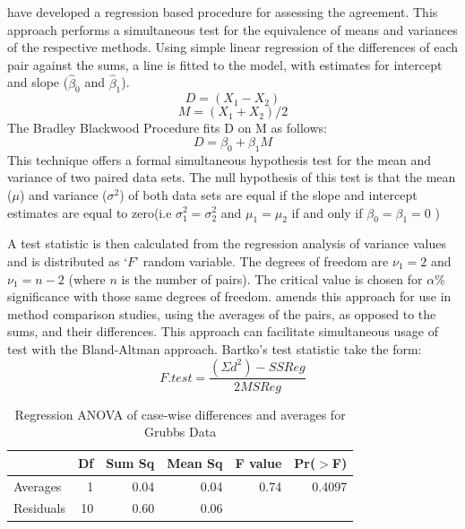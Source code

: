 \documentclass[12pt, a4paper]{report}
\theoremstyle{plain}
\theoremstyle{definition}
\theoremstyle{remark}
\begin{document}
	\citet{BB89} have developed a regression based procedure for
	assessing the agreement. This approach performs a simultaneous test for the equivalence of
	means and variances of the respective methods. Using simple linear
	regression of the differences of each pair against the sums, a
	line is fitted to the model, with estimates for intercept and
	slope ($\hat{\beta}_{0}$ and $\hat{\beta}_{1}$).
	\begin{equation}
		D = (X_{1}-X_{2})
	\end{equation}
	\begin{equation}
		M = (X_{1} + X_{2}) /2
	\end{equation}
	The Bradley Blackwood Procedure fits D on M as follows:\\
	\begin{equation}
		D = \beta_{0} + \beta_{1}M
	\end{equation}
	This technique offers a formal simultaneous hypothesis test for the
	mean and variance of two paired data sets.  The null
	hypothesis of this test is that the mean ($\mu$) and variance
	($\sigma^{2}$) of both data sets are equal if the slope and
	intercept estimates are equal to zero(i.e $\sigma^{2}_{1} =
	\sigma^{2}_{2}$ and $\mu_{1}=\mu_{2}$ if and only if $\beta_{0}=
	\beta_{1}=0$ )
	
	A test statistic is then calculated from the regression analysis
	of variance values \citep{BB89} and is distributed as `$F$' random
	variable. The degrees of freedom are $\nu_{1}=2$ and $\nu_{1}=n-2$
	(where $n$ is the number of pairs). The critical value is chosen
	for $\alpha\%$ significance with those same degrees of freedom.
	\citet{Bartko} amends this approach for use in method
	comparison studies, using the averages of the pairs, as opposed to
	the sums, and their differences. This approach can facilitate
	simultaneous usage of test with the Bland-Altman approach.
	Bartko's test statistic take the form:
	\[ F.test = \frac{(\Sigma d^{2})-SSReg}{2MSReg}
	\]
	\begin{table}[h!]
		\begin{center}
			\begin{tabular}{lrrrrr}
				\hline
				& Df & Sum Sq & Mean Sq & F value & Pr($>$F) \\
				\hline
				Averages & 1 & 0.04 & 0.04 & 0.74 & 0.4097 \\
				Residuals & 10 & 0.60 & 0.06 &  &  \\
				\hline
			\end{tabular}
			\caption{Regression ANOVA of case-wise differences and averages
				for Grubbs Data}
		\end{center}
	\end{table}
	
\end{document}
